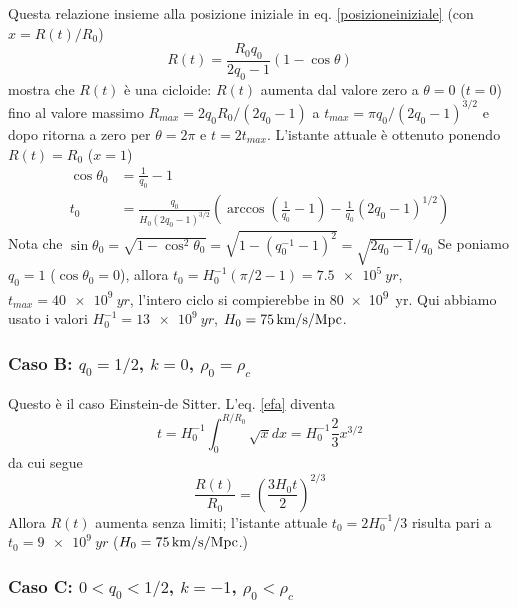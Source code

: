 Questa relazione insieme alla posizione iniziale in eq. \eqref{posizioneiniziale}
(con $x=R(t)/R_0$)
\begin{equation}
  R(t)= \frac {R_0 q_0} {2q_0-1} (1-\cos \theta)
\end{equation}
mostra che $R(t)$ è una cicloide: $R(t)$ aumenta dal valore zero a $\theta=0$
($t=0$) fino al valore massimo $R_{max}= {2 q_0 R_0 }/({2q_0-1})$ a
$t_{max}= \pi q_0/(2q_0-1)^{3/2}$ e dopo ritorna a zero per $\theta =2 \pi$ e
$t=2t_{max}$.  L'istante attuale è ottenuto ponendo $R(t)=R_0$ ($x=1$)
\begin{subequations}
  \begin{align}
    \cos\theta_0 &= \frac {1} {q_0} -1 \\
    t_0 &= \frac {q_0}{H_0 (2q_0-1)^{3/2}} \left(\arccos(\frac {1}{q_0}-1) -
      \frac {1}{q_0}(2q_0-1)^{1/2} \right)
  \end{align}
\end{subequations}
Nota che
$\sin \theta_0= \sqrt{1-\cos^2\theta_0}= \sqrt{1-(q_0^{-1}-1)^2}=
{\sqrt{2q_0-1}}/{q_0}$
Se poniamo $q_0=1$ ($\cos \theta_0=0$), allora
$t_0 = H_0^{-1} (\pi /2-1) = \SI{7.5e5}{yr}$, $t_{max} = \SI{40e9}{yr}$,
l'intero ciclo si compierebbe in \SI{80e9}{yr}.  Qui abbiamo usato i valori
$H_0^{-1} = \SI{13e9}{yr}$,
$H_0 = \SI{75}{\kilo\metre \per \second \per \mega pc}$.

\subsubsection{Caso B: $q_0 = 1/2$, $k=0$, $\rho_0=  \rho_c$}

Questo è il caso Einstein-de Sitter.  L'eq. \eqref{efa} diventa
\begin{equation}
  t = H_0^{-1} \int_0^{R/R_0} \sqrt x dx = H_0^{-1} \frac{2} {3} x^{3/2}
\end{equation}
da cui segue
\begin{equation}
  \frac{R(t)}{R_0} = \left( \frac {3H_0 t}{2} \right)^{2/3}
\end{equation}
Allora $R(t)$ aumenta senza limiti; l'istante attuale $t_0=2H_0^{-1}/3$ risulta
pari a $t_0= \SI{9e9}{yr}$
($H_0= \SI{75}{\kilo\metre \per \second \per \mega pc}$.)

\subsubsection{Caso C: $0< q_0 < 1/2$, $k=-1$, $\rho_0 <  \rho_c$ }

